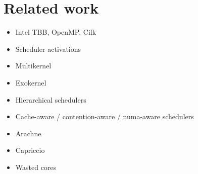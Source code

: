 \section{Related work}
\begin{itemize}
  \item Intel TBB, OpenMP, Cilk \cite{contreras2008characterizing}
  \item Scheduler activations \cite{anderson1992scheduler}
  \item Multikernel
  \item Exokernel
  \item Hierarchical schedulers
  \item Cache-aware / contention-aware / numa-aware schedulers
  \item Arachne
  \item Capriccio
  \item Wasted cores
\end{itemize}
